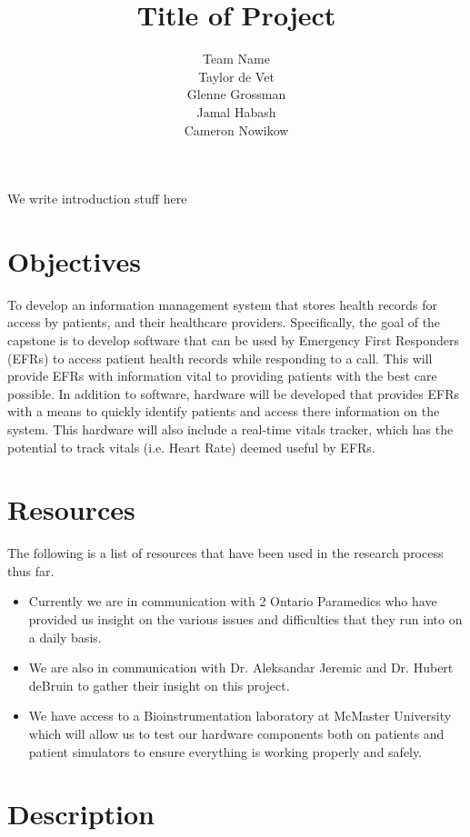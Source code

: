 \documentclass{article}
\title{Title of Project}
\author{Team Name
		\\ Taylor de Vet
    \\ Glenne Grossman
		\\ Jamal Habash
		\\ Cameron Nowikow
}
\date{}
\begin{document}
\newpage

\maketitle

We write introduction stuff here

\section{Objectives}

To develop an information management system that stores health records for access by patients, and their healthcare providers. Specifically, the goal of the capstone is to develop software that can be used by Emergency First Responders (EFRs) to access patient health records while responding to a call. This will provide EFRs with information vital to providing patients with the best care possible. In addition to software, hardware will be developed that provides EFRs with a means to quickly identify patients and access there information on the system. This hardware will also include a real-time vitals tracker, which has the potential to track vitals (i.e. Heart Rate) deemed useful by EFRs.

\section{Resources}
The following is a list of resources that have been used in the research process thus far.
\begin{itemize}
\item Currently we are in communication with 2 Ontario Paramedics who have provided us insight on the various issues and difficulties that they run into on a daily basis.
\item We are also in communication with Dr. Aleksandar Jeremic and Dr. Hubert deBruin to gather their insight on this project.
\item We have access to a Bioinstrumentation laboratory at McMaster University which will allow us to test our hardware components both on patients and patient simulators to ensure everything is working properly and safely.
\end{itemize}



\section{Description}
\end{document}
